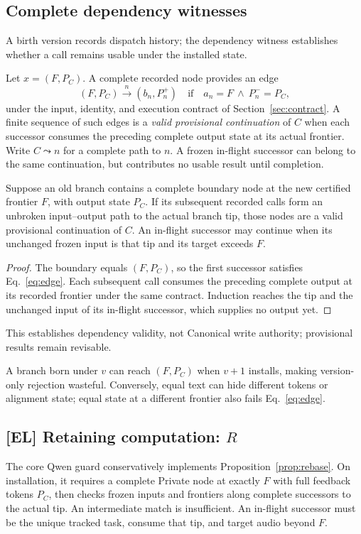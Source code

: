 \subsection{Complete dependency witnesses}
A birth version records dispatch history; the dependency witness
establishes whether a call remains usable under the installed state.

Let $x=(F,P_C)$. A complete recorded node provides an edge
\begin{equation}
 (F,P_C)\xrightarrow{n}(b_n,P_n^+)
 \quad\text{if}\quad a_n=F\ \land\ P_n^-=P_C,
 \label{eq:edge}
\end{equation}
under the input, identity, and execution contract of
Section~\ref{sec:contract}. A finite sequence of such edges is a
\emph{valid provisional continuation} of $C$ when each successor consumes
the preceding complete output state at its actual frontier. Write
$C\leadsto n$ for a complete path to $n$. A frozen in-flight successor can
belong to the same continuation, but contributes no usable result until
completion.

\begin{proposition}
\label{prop:rebase}
Suppose an old branch contains a complete boundary node at the new certified
frontier $F$, with output state $P_C$. If its subsequent recorded calls form
an unbroken input--output path to the actual branch tip, those nodes are a
valid provisional continuation of $C$. An in-flight successor may continue
when its unchanged frozen input is that tip and its target exceeds $F$.
\end{proposition}
\begin{proof}
The boundary equals $(F,P_C)$, so the first successor satisfies
Eq.~\eqref{eq:edge}. Each subsequent call consumes the preceding complete
output at its recorded frontier under the same contract. Induction reaches
the tip and the unchanged input of its in-flight successor, which supplies
no output yet.
\end{proof}

This establishes dependency validity, not Canonical write authority;
provisional results remain revisable.

A branch born under $v$ can reach $(F,P_C)$ when $v+1$ installs, making
version-only rejection wasteful. Conversely, equal text can hide different
tokens or alignment state; equal state at a different frontier also fails
Eq.~\eqref{eq:edge}.

\subsection{[EL] Retaining computation: \texorpdfstring{$R$}{R}}
The core Qwen guard conservatively implements Proposition~\ref{prop:rebase}.
On installation, it requires a complete Private node at exactly $F$ with
full feedback tokens $P_C$, then checks frozen inputs and frontiers along
complete successors to the actual tip. An intermediate match is insufficient.
An in-flight successor must be the unique tracked task, consume that tip,
and target audio beyond $F$.

